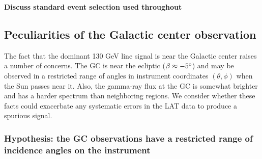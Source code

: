 \documentclass[aps,twocolumn,prd,superscriptaddress,showpacs,nofootinbib,fixfloat]{revtex4}
\newcommand{\degree}{^{\rm o}}
\begin{document}
\textbf{Discuss standard event selection used throughout}

\subsection{Peculiarities of the Galactic center observation}
The fact that the dominant 130 GeV line signal is near the Galactic center
raises a number of concerns.  The GC is near the ecliptic ($\beta \approx
-5\degree$) and may be observed in a restricted range of angles in instrument
coordinates $(\theta, \phi)$ when the Sun passes near it.  Also, the gamma-ray
flux at the GC is somewhat brighter and has a harder spectrum than neighboring
regions.  We consider whether these facts could exacerbate any systematic
errors in the LAT data to produce a spurious signal.

\subsubsection{Hypothesis: the GC observations have a restricted range of
incidence angles on the instrument}
\end{document}
